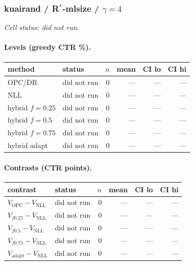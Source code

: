 \documentclass[10pt,a4paper]{article}
\begin{document}
\subsubsection{kuairand / R$^*$-mlsize / $\gamma=4$}
\emph{Cell status: did not run}.
\paragraph{Levels (greedy CTR \%).}
{\centering\small\begin{tabular}{llrrrr}
\toprule method & status & $n$ & mean & CI lo & CI hi \\
\midrule
OPC/DR & did not run & 0 & --- & --- & --- \\
NLL & did not run & 0 & --- & --- & --- \\
hybrid $f{=}0.25$ & did not run & 0 & --- & --- & --- \\
hybrid $f{=}0.5$ & did not run & 0 & --- & --- & --- \\
hybrid $f{=}0.75$ & did not run & 0 & --- & --- & --- \\
hybrid adapt & did not run & 0 & --- & --- & --- \\
\bottomrule\end{tabular}\par}
\paragraph{Contrasts (CTR points).}
{\centering\small\begin{tabular}{llrrrr}
\toprule contrast & status & $n$ & mean & CI lo & CI hi \\
\midrule
$V_{\mathrm{OPC}}-V_{\mathrm{NLL}}$ & did not run & 0 & --- & --- & --- \\
$V_{f0.25}-V_{\mathrm{NLL}}$ & did not run & 0 & --- & --- & --- \\
$V_{f0.5}-V_{\mathrm{NLL}}$ & did not run & 0 & --- & --- & --- \\
$V_{f0.75}-V_{\mathrm{NLL}}$ & did not run & 0 & --- & --- & --- \\
$V_{\mathrm{adapt}}-V_{\mathrm{NLL}}$ & did not run & 0 & --- & --- & --- \\
\bottomrule\end{tabular}\par}
\end{document}
